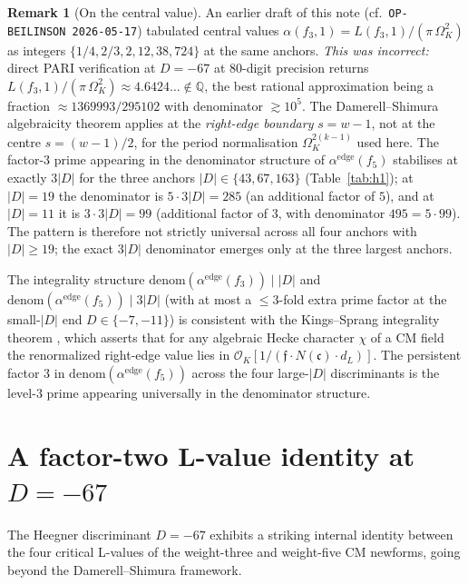 \documentclass[11pt,a4paper]{amsart}
\theoremstyle{plain}
\theoremstyle{definition}
\newtheorem{remark}[theorem]{Remark}
\newcommand{\Q}{\mathbb{Q}}
\newcommand{\OK}{\mathcal{O}_K}
\newcommand{\alphaedge}{\alpha^{\mathrm{edge}}}
\begin{document}
\begin{remark}[On the central value]
\label{rk:central}
An earlier draft of this note (cf.\ \texttt{OP-BEILINSON 2026-05-17})
tabulated central values
$\alpha(f_3,1)=L(f_3,1)/(\pi\,\Omega_K^{2})$ as integers
$\{1/4,2/3,2,12,38,724\}$ at the same anchors. \emph{This was incorrect:}
direct PARI verification at $D=-67$ at 80-digit precision returns
$L(f_3,1)/(\pi\,\Omega_K^{2})\approx 4.6424\ldots\notin\Q$, the best
rational approximation being a fraction
$\approx 1369993/295102$ with denominator $\gtrsim 10^5$. The
Damerell--Shimura algebraicity theorem applies at the
\emph{right-edge boundary} $s=w-1$, not at the centre $s=(w-1)/2$, for
the period normalisation $\Omega_K^{2(k-1)}$ used here. The factor-$3$
prime appearing in the denominator structure of $\alphaedge(f_5)$
stabilises at exactly $3|D|$ for the three anchors $|D| \in
\{43, 67, 163\}$ (Table~\ref{tab:h1}); at $|D|=19$ the denominator
is $5\cdot 3|D| = 285$ (an additional factor of $5$), and at
$|D|=11$ it is $3\cdot 3|D| = 99$ (additional factor of $3$, with
denominator $495 = 5\cdot 99$). The pattern is therefore not strictly
universal across all four anchors with $|D|\ge 19$; the exact
$3|D|$ denominator emerges only at the three largest anchors.
\end{remark}

The integrality structure $\mathrm{denom}(\alphaedge(f_3))\mid |D|$
and $\mathrm{denom}(\alphaedge(f_5))\mid 3|D|$ (with at most a $\le 3$-fold
extra prime factor at the small-$|D|$ end $D\in\{-7,-11\}$) is consistent
with the Kings--Sprang integrality theorem
\cite[Theorem~A]{KingsSprang2025}, which asserts that for any algebraic
Hecke character $\chi$ of a CM field the renormalized
right-edge value lies in
$\OK[1/(\mathfrak{f}\cdot N(\mathfrak{c})\cdot d_L)]$. The persistent
factor $3$ in $\mathrm{denom}(\alphaedge(f_5))$ across the four
large-$|D|$ discriminants is the level-$3$ prime appearing universally
in the denominator structure.

\section{A factor-two L-value identity at $D=-67$}
\label{sec:factor2}

The Heegner discriminant $D=-67$ exhibits a striking internal identity
between the four critical L-values of the weight-three and weight-five
CM newforms, going beyond the Damerell--Shimura framework.
\end{document}
